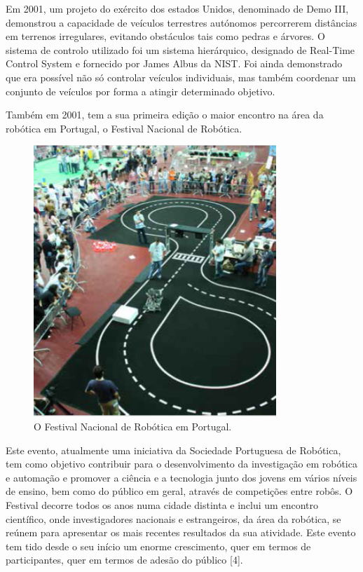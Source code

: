 \documentclass[a4paper,10pt]{texRel}
\begin{document}
Em 2001, um projeto do exército dos estados Unidos, denominado de Demo III, demonstrou a capacidade de veículos terrestres autónomos percorrerem distâncias em terrenos irregulares, evitando obstáculos tais como pedras e árvores. O sistema de controlo utilizado foi um sistema hierárquico, designado de Real-Time Control System e fornecido por James Albus da NIST. Foi ainda demonstrado que era possível não só controlar veículos individuais, mas também coordenar um conjunto de veículos por forma a atingir determinado objetivo.

Também em 2001, tem a sua primeira edição o maior encontro na área da robótica em Portugal, o Festival Nacional de Robótica. 

\begin{figure}[H]
\centering
\includegraphics{imagens/cap2/FNR.png}
\caption{O Festival Nacional de Robótica em Portugal.}
\label{fign}
\end{figure}

Este evento, atualmente uma iniciativa da Sociedade Portuguesa de Robótica, tem como objetivo contribuir para o desenvolvimento da investigação em robótica e automação e promover a ciência e a tecnologia junto dos jovens em vários níveis de ensino, bem como do público em geral, através de competições entre robôs. O Festival decorre todos os anos numa cidade distinta e inclui um encontro científico, onde investigadores nacionais e estrangeiros, da área da robótica, se reúnem para apresentar os mais recentes resultados da sua atividade. Este evento tem tido desde o seu início um enorme crescimento, quer em termos de participantes, quer em termos de adesão do público [4]. 
\end{document}
